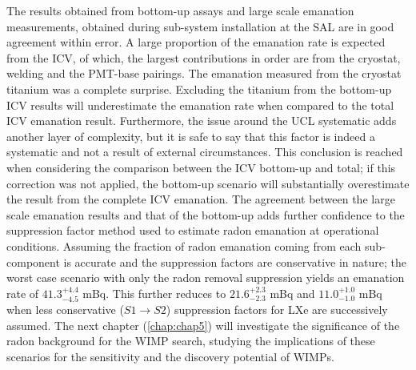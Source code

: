 The results obtained from bottom-up assays and large scale emanation measurements, obtained during sub-system installation at the SAL are in good agreement within error. A large proportion of the emanation rate is expected from the ICV, of which, the largest contributions in order are from the cryostat, welding and the PMT-base pairings. The emanation measured from the cryostat titanium was a complete surprise. Excluding the titanium from the bottom-up ICV results will underestimate the emanation rate when compared to the total ICV emanation result. Furthermore, the issue around the UCL systematic adds another layer of complexity, but it is safe to say that this factor is indeed a systematic and not a result of external circumstances. This conclusion is reached when considering the comparison between the ICV bottom-up and total; if this correction was not applied, the bottom-up scenario will substantially overestimate the result from the complete ICV emanation. The agreement between the large scale emanation results and that of the bottom-up adds further confidence to the suppression factor method used to estimate radon emanation at operational conditions. Assuming the fraction of radon emanation coming from each sub-component is accurate and the suppression factors are conservative in nature; the worst case scenario with only the radon removal suppression yields an emanation rate of $41.3^{+4.4}_{-4.5}$ mBq. This further reduces to $21.6^{+2.3}_{-2.3}$ mBq and $11.0^{+1.0}_{-1.0}$ mBq when less conservative ($S1\rightarrow{}S2$) suppression factors for LXe are successively assumed. The next chapter (\ref{chap:chap5}) will investigate the significance of the radon background for the WIMP search, studying the implications of these scenarios for the sensitivity and the discovery potential of WIMPs.

